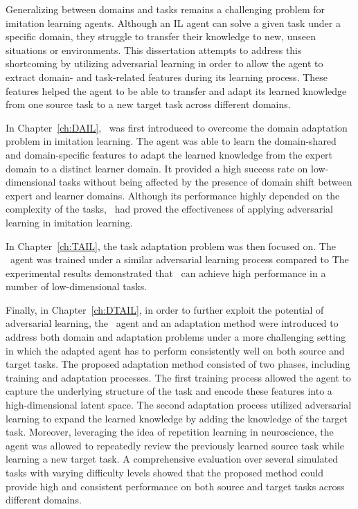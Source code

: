 Generalizing between domains and tasks remains a challenging problem for imitation learning agents.
Although an IL agent can solve a given task under a specific domain,
they struggle to transfer their knowledge to new,
unseen situations or environments.
This dissertation attempts to address this shortcoming by utilizing adversarial learning in order to allow the agent to extract domain- and task-related features during its learning process.
These features helped the agent to be able to transfer and adapt its learned knowledge from one source task to a new target task across different domains.

In Chapter~\ref{ch:DAIL},
\DAIL\ was first introduced to overcome the domain adaptation problem in imitation learning.
The agent was able to learn the domain-shared and domain-specific features to adapt the learned knowledge from the expert domain to a distinct learner domain.
It provided a high success rate on low-dimensional tasks without being affected by the presence of domain shift between expert and learner domains.
Although its performance highly depended on the complexity of the tasks,
\DAIL\ had proved the effectiveness of applying adversarial learning in imitation learning.

In Chapter~\ref{ch:TAIL},
the task adaptation problem was then focused on.
The \TAIL\ agent was trained under a similar adversarial learning process compared to \DAIL\.
The experimental results demonstrated that \TAIL\ can achieve high performance in a number of low-dimensional tasks.

Finally,
in Chapter~\ref{ch:DTAIL},
in order to further exploit the potential of adversarial learning,
the \DTAIL\ agent and an adaptation method were introduced to address both domain and adaptation problems under a more challenging setting in which the adapted agent has to perform consistently well on both source and target tasks.
The proposed adaptation method consisted of two phases,
including training and adaptation processes.
The first training process allowed the agent to capture the underlying structure of the task and encode these features into a high-dimensional latent space.
The second adaptation process utilized adversarial learning to expand the learned knowledge by adding the knowledge of the target task.
Moreover,
leveraging the idea of repetition learning in neuroscience,
the agent was allowed to repeatedly review the previously learned source task while learning a new target task.
A comprehensive evaluation over several simulated tasks with varying difficulty levels showed that the proposed method could provide high and consistent performance on both source and target tasks across different domains.


